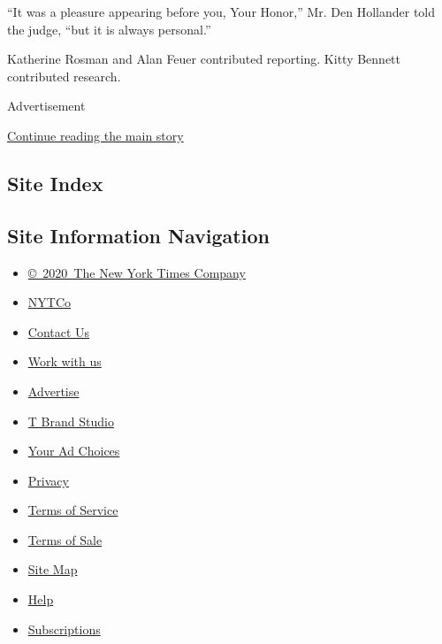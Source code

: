 ``It was a pleasure appearing before you, Your Honor,'' Mr. Den
Hollander told the judge, ``but it is always personal.''

Katherine Rosman and Alan Feuer contributed reporting. Kitty Bennett
contributed research.

Advertisement

\protect\hyperlink{after-bottom}{Continue reading the main story}

\hypertarget{site-index}{%
\subsection{Site Index}\label{site-index}}

\hypertarget{site-information-navigation}{%
\subsection{Site Information
Navigation}\label{site-information-navigation}}

\begin{itemize}
\tightlist
\item
  \href{https://help.nytimes3xbfgragh.onion/hc/en-us/articles/115014792127-Copyright-notice}{©~2020~The
  New York Times Company}
\end{itemize}

\begin{itemize}
\tightlist
\item
  \href{https://www.nytco.com/}{NYTCo}
\item
  \href{https://help.nytimes3xbfgragh.onion/hc/en-us/articles/115015385887-Contact-Us}{Contact
  Us}
\item
  \href{https://www.nytco.com/careers/}{Work with us}
\item
  \href{https://nytmediakit.com/}{Advertise}
\item
  \href{http://www.tbrandstudio.com/}{T Brand Studio}
\item
  \href{https://www.nytimes3xbfgragh.onion/privacy/cookie-policy\#how-do-i-manage-trackers}{Your
  Ad Choices}
\item
  \href{https://www.nytimes3xbfgragh.onion/privacy}{Privacy}
\item
  \href{https://help.nytimes3xbfgragh.onion/hc/en-us/articles/115014893428-Terms-of-service}{Terms
  of Service}
\item
  \href{https://help.nytimes3xbfgragh.onion/hc/en-us/articles/115014893968-Terms-of-sale}{Terms
  of Sale}
\item
  \href{https://spiderbites.nytimes3xbfgragh.onion}{Site Map}
\item
  \href{https://help.nytimes3xbfgragh.onion/hc/en-us}{Help}
\item
  \href{https://www.nytimes3xbfgragh.onion/subscription?campaignId=37WXW}{Subscriptions}
\end{itemize}
